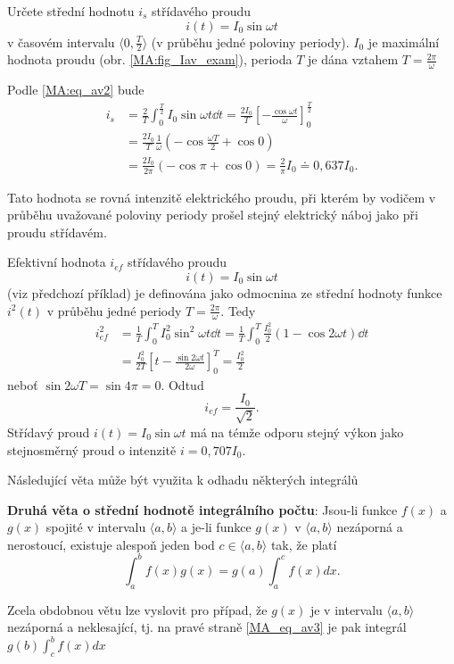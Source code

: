 {  \begin{example} Určete střední hodnotu $i_s$ střídavého proudu $$i(t) = I_0\sin\omega t$$ v
    časovém intervalu $\langle 0, \frac{T}{2}\rangle$ (v průběhu jedné poloviny periody). $I_0$ je
    maximální hodnota proudu (obr. \ref{MA:fig_Iav_exam}), perioda $T$ je dána vztahem $T =
    \frac{2\pi}{\omega}$
        

    Podle \ref{MA:eq_av2} bude
    \begin{align*}
     i_s &=  \frac{2}{T}
             \int_0^{\frac{T}{2}}I_0\sin\omega t\dd{t} =
             \frac{2I_0}{T}\left[-\frac{\cos\omega t}{\omega}\right]_0^{\frac{T}{2}}        \\
         &=  \frac{2I_0}{T}\frac{1}{\omega}\left(-\cos\frac{\omega T}{2}+ \cos 0\right)     \\
         &=  \frac{2I_0}{2\pi}(-\cos\pi + \cos 0) = \frac{2}{\pi}I_0 \doteq 0,637 I_0.
  \end{align*}

  Tato hodnota se rovná intenzitě elektrického proudu, při kterém by vodičem v průběhu uvažované
  poloviny periody prošel stejný elektrický náboj jako při proudu střídavém.
  \end{example}

  \begin{example} Efektivní hodnota $i_{ef}$ střídavého proudu $$i(t) = I_0\sin\omega t$$ (viz
    předchozí příklad) je definována jako odmocnina ze střední hodnoty funkce $i^2(t)$ v průběhu
    jedné periody $T = \frac{2\pi}{\omega}$. Tedy
    \begin{align*}
      i_{ef}^2 &= \frac{1}{T}\int_0^T I_0^2\sin^2\omega t\dd{t} = 
                  \frac{1}{T}\int_0^T \frac{I_0^2}{2}(1- \cos2\omega t)\dd{t}           \\
               &= \frac{I_0^2}{2T}
                  \left[
                    t-\frac{\sin2\omega t}{2\omega}
                  \right]_0^T = \frac{I_0^2}{2}
    \end{align*}
    neboť $\sin2\omega T=\sin4\pi = 0.$ Odtud $$i_{ef} = \frac{I_0}{\sqrt{2}}.$$ Střídavý proud
    $i(t) = I_0\sin\omega t$ má na témže odporu stejný výkon jako stejnosměrný proud o intenzitě
    $i = 0,707I_0$.
  \end{example}
  Následující věta může být využita k odhadu některých integrálů
  \begin{lemma}
    \textbf{Druhá věta o střední hodnotě integrálního počtu}: Jsou-li funkce $f(x)$ a $g(x)$
    spojité v intervalu $\langle a, b \rangle$ a je-li funkce $g(x)$ v $\langle a, b \rangle$
    nezáporná a nerostoucí, existuje alespoň jeden bod $c\in\langle a, b \rangle$ tak, že platí
    \begin{equation}\label{MA_eq_av3}
        \int_a^b f(x)g(x) = g(a)\int_a^c f(x)dx.
    \end{equation}
  \end{lemma}
  Zcela obdobnou větu lze vyslovit pro případ, že $g(x)$ je v intervalu $\langle a, b \rangle$
  nezáporná a neklesající, tj. na pravé straně \ref{MA_eq_av3} je pak integrál $g(b)\int_c^b
  f(x)dx$

}
